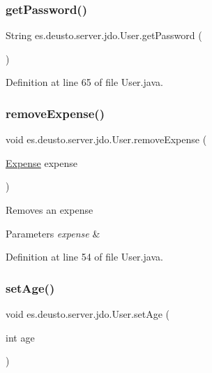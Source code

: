 \subsubsection{\texorpdfstring{get\+Password()}{getPassword()}}
{\footnotesize\ttfamily String es.\+deusto.\+server.\+jdo.\+User.\+get\+Password (\begin{DoxyParamCaption}{ }\end{DoxyParamCaption})}



Definition at line 65 of file User.\+java.

\mbox{\label{classes_1_1deusto_1_1server_1_1jdo_1_1_user_a2ecb8023580fdee24c3f6d6a28b23a86}} 
\subsubsection{\texorpdfstring{remove\+Expense()}{removeExpense()}}
{\footnotesize\ttfamily void es.\+deusto.\+server.\+jdo.\+User.\+remove\+Expense (\begin{DoxyParamCaption}\item[{\hyperlink{classes_1_1deusto_1_1server_1_1jdo_1_1_expense}{Expense}}]{expense }\end{DoxyParamCaption})}

Removes an expense 
\begin{DoxyParams}{Parameters}
{\em expense} & \\
\hline
\end{DoxyParams}


Definition at line 54 of file User.\+java.

\mbox{\label{classes_1_1deusto_1_1server_1_1jdo_1_1_user_adc28a24f0a24c86ca31b10d8ffb23232}} 
\subsubsection{\texorpdfstring{set\+Age()}{setAge()}}
{\footnotesize\ttfamily void es.\+deusto.\+server.\+jdo.\+User.\+set\+Age (\begin{DoxyParamCaption}\item[{int}]{age }\end{DoxyParamCaption})}




